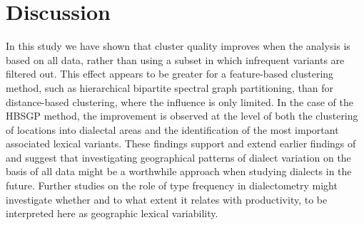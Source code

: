 \documentclass[output=paper]{LSP/langsci}
\begin{document}
\section{Discussion}
In this study we have shown that cluster quality improves when the analysis is based on all data, rather than using a subset in which infrequent variants are filtered out. This effect appears to be greater for a feature-based clustering method, such as hierarchical bipartite spectral graph partitioning, than for distance-based clustering, where the influence is only limited. In the case of the HBSGP method, the improvement is observed at the level of both the clustering of locations into dialectal areas and the identification of the most important associated lexical variants. These findings support and extend earlier findings of \citet{nerbonne_toward_2007} and suggest that investigating geographical patterns of dialect variation on the basis of all data might be a worthwhile approach when studying dialects in the future. Further studies on the role of type frequency in dialectometry might investigate whether and to what extent it relates with productivity,  to be interpreted here as geographic lexical variability.

\printbibliography[heading=subbibliography,notkeyword=this]
\end{document}
